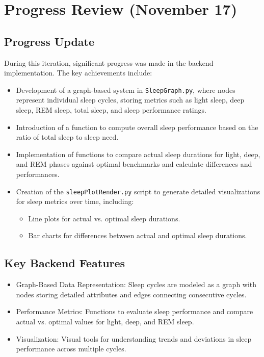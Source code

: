 \documentclass{article}
\begin{document}
\section{Progress Review (November 17)}

\subsection{Progress Update}
During this iteration, significant progress was made in the backend implementation. The key achievements include:
\begin{itemize}
    \item Development of a graph-based system in \texttt{SleepGraph.py}, where nodes represent individual sleep cycles, storing metrics such as light sleep, deep sleep, REM sleep, total sleep, and sleep performance ratings.
    \item Introduction of a function to compute overall sleep performance based on the ratio of total sleep to sleep need.
    \item Implementation of functions to compare actual sleep durations for light, deep, and REM phases against optimal benchmarks and calculate differences and performances.
    \item Creation of the \texttt{sleepPlotRender.py} script to generate detailed visualizations for sleep metrics over time, including:
    \begin{itemize}
        \item Line plots for actual vs. optimal sleep durations.
        \item Bar charts for differences between actual and optimal sleep durations.
    \end{itemize}
\end{itemize}

\subsection{Key Backend Features}
\begin{itemize}
    \item Graph-Based Data Representation: Sleep cycles are modeled as a graph with nodes storing detailed attributes and edges connecting consecutive cycles.
    \item Performance Metrics: Functions to evaluate sleep performance and compare actual vs. optimal values for light, deep, and REM sleep.
    \item Visualization: Visual tools for understanding trends and deviations in sleep performance across multiple cycles.
\end{itemize}
\end{document}
